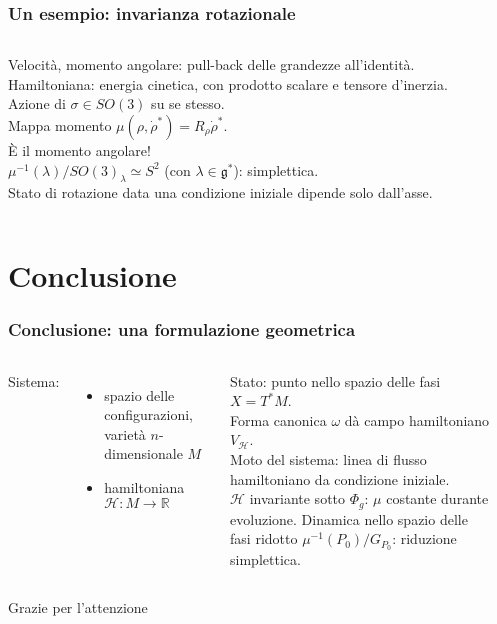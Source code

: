\documentclass[]{beamer}
\newcommand{\R}{\mathbb{R}}
\begin{document}
\begin{frame}
\frametitle{Un esempio: invarianza rotazionale}
\begin{columns}
  Velocità, momento angolare: pull-back delle grandezze all'identità.\\
  Hamiltoniana: energia cinetica, con prodotto scalare e tensore d'inerzia.\\[11pt]
  Azione di $\sigma \in SO(3)$ su se stesso.\\
  Mappa momento $\mu(\rho, \dot{\rho}^*) = R_{\rho}\dot{\rho}^*$.\\ È il \alert{momento angolare}!\\[11pt]
  $\mu^{-1}(\lambda)/SO(3)_{\lambda} \simeq S^2$ (con $\lambda \in \mathfrak{g}^*$): simplettica.\\ 
  Stato di rotazione data una condizione iniziale dipende solo dall'asse.\\[11pt]
    \begin{center}
          
    \end{center}
\end{columns}
\end{frame}

\section{Conclusione}

\begin{frame}
\frametitle{Conclusione: una formulazione geometrica}
\begin{columns}
  Sistema: 
  \begin{itemize}
    \item {spazio delle configurazioni}, varietà $n$-dimensionale $M$
    \item {hamiltoniana} $\mathcal{H}: M\to \R$
  \end{itemize}
  {Stato}: punto nello {spazio delle fasi} $X = T^* M$.\\ 
  {Forma canonica} $\omega$ dà {campo hamiltoniano} $V_{\mathcal{H}}$.\\[5pt]
  \alert{Moto del sistema: linea di flusso hamiltoniano da condizione iniziale.}\\[5pt]
  $\mathcal{H}$ invariante sotto $\Phi_g$: $\mu$ costante durante evoluzione. Dinamica nello spazio delle fasi ridotto $\mu^{-1}(P_0)/G_{P_0}$: riduzione simplettica. 
    \begin{center}
          
    \end{center}
\end{columns}
\end{frame}

\appendix
\begin{frame}[plain]
\hspace{0pt}
\vfill
\begin{center}
  \Huge Grazie per l'attenzione
\end{center}
\vfill
\hspace{0pt}
\end{frame}
\end{document}
